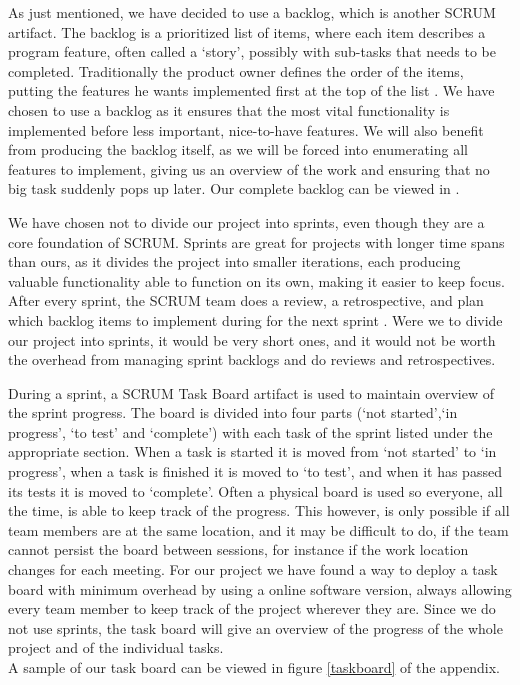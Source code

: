 As just mentioned, we have decided to use a backlog, which is another SCRUM artifact.
The backlog is a prioritized list of items, where each item describes a program feature, often called a `story', possibly with sub-tasks that needs to be completed. Traditionally the product owner defines the order of the items, putting the features he wants implemented first at the top of the list \cite[p. 12]{scrum-org-guide}.
We have chosen to use a backlog as it ensures that the most vital functionality is implemented before less important, nice-to-have features. We will also benefit from producing the backlog itself, as we will be forced into enumerating all features to implement, giving us an overview of the work and ensuring that no big task suddenly pops up later.
Our complete backlog can be viewed in .

We have chosen not to divide our project into sprints, even though they are a core foundation of SCRUM.
Sprints are great for projects with longer time spans than ours, as it divides the project into smaller iterations, each producing valuable functionality able to function on its own, making it easier to keep focus.
After every sprint, the SCRUM team does a review, a retrospective, and plan which backlog items to implement during for the next sprint \cite[p. 8]{scrum-org-guide}.
Were we to divide our project into sprints, it would be very short ones, and it would not be worth the overhead from managing sprint backlogs and do reviews and retrospectives.

During a sprint, a SCRUM Task Board artifact is used to maintain overview of the sprint progress. The board is divided into four parts (`not started',`in progress', `to test' and `complete') with each task of the sprint listed under the appropriate section.
When a task is started it is moved from `not started' to `in progress', when a task is finished it is moved to `to test', and when it has passed its tests it is moved to `complete'.
Often a physical board is used so everyone, all the time, is able to keep track of the progress. This however, is only possible if all team members are at the same location, and it may be difficult to do, if the team cannot persist the board between sessions, for instance if the work location changes for each meeting.
For our project we have found a way to deploy a task board with minimum overhead by using a online software version, always allowing every team member to keep track of the project wherever they are. Since we do not use sprints, the task board will give an overview of the progress of the whole project and of the individual tasks.\\
A sample of our task board can be viewed in figure \ref{taskboard} of the appendix.

